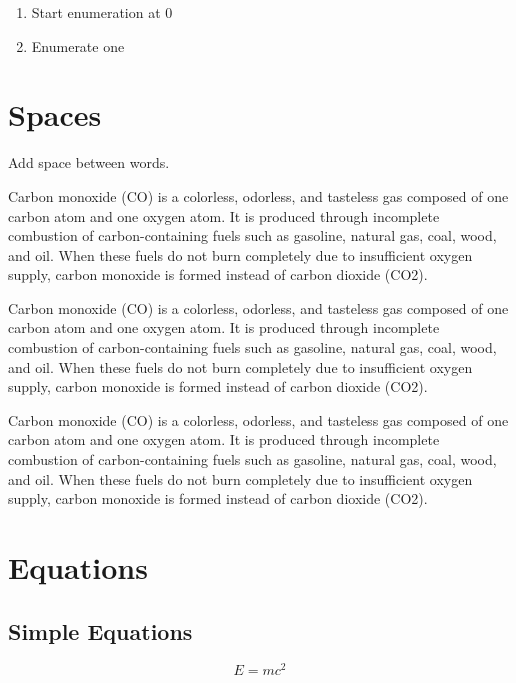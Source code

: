 \documentclass{article} %
\begin{document}
\begin{enumerate}\addtocounter{enumi}{-1}
    \item Start enumeration at 0
    \item Enumerate one
\end{enumerate}

\section{Spaces}

Add space between \quad words.

Carbon monoxide (CO) is a colorless, odorless, and tasteless gas composed of one carbon atom and one oxygen atom. It is produced through incomplete combustion of carbon-containing fuels such as gasoline, natural gas, coal, wood, and oil. When these fuels do not burn completely due to insufficient oxygen supply, carbon monoxide is formed instead of carbon dioxide (CO2).

\begin{spacing}{0.8} 
Carbon monoxide (CO) is a colorless, odorless, and tasteless gas composed of one carbon atom and one oxygen atom. It is produced through incomplete combustion of carbon-containing fuels such as gasoline, natural gas, coal, wood, and oil. When these fuels do not burn completely due to insufficient oxygen supply, carbon monoxide is formed instead of carbon dioxide (CO2).
\end{spacing}

\begin{spacing}{1.5} 
Carbon monoxide (CO) is a colorless, odorless, and tasteless gas composed of one carbon atom and one oxygen atom. It is produced through incomplete combustion of carbon-containing fuels such as gasoline, natural gas, coal, wood, and oil. When these fuels do not burn completely due to insufficient oxygen supply, carbon monoxide is formed instead of carbon dioxide (CO2).
\end{spacing}

\section{Equations}

\subsection{Simple Equations}

\begin{equation}
    E=mc^2
\end{equation}
\end{document}
